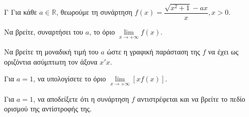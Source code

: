 \begin{thema}{Γ}
Για κάθε $a \in \mathbb{R}$, θεωρούμε τη συνάρτηση $f(x) = \dfrac{\sqrt{x^2+1} - a x}{x}, x > 0$.
\begin{erwthma}
  \item Να βρείτε, συναρτήσει του $a$, το όριο $\lim\limits_{x \to +\infty} f(x)$.
  \item Να βρείτε τη μοναδική τιμή του $a$ ώστε η γραφική παράσταση της $f$ να έχει ως οριζόντια ασύμπτωτη τον άξονα $x'x$.
  \item Για $a = 1$, να υπολογίσετε το όριο $\lim\limits_{x \to +\infty} [ x f(x) ]$.
  \item Για $a=1$, να αποδείξετε ότι η συνάρτηση $f$ αντιστρέφεται και να βρείτε το πεδίο ορισμού της αντίστροφής της.
\end{erwthma}
\end{thema}
